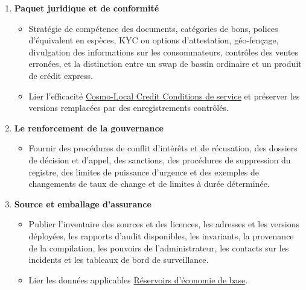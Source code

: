 \documentclass[11pt]{article}
\begin{document}
\begin{enumerate}[leftmargin=*]
\begin{itemize}[leftmargin=*]
\end{itemize}
\item \textbf{Paquet juridique et de conformité}
\begin{itemize}[leftmargin=*]
\item Stratégie de compétence des documents, catégories de bons, polices d'équivalent en espèces, KYC ou options d'attestation, géo-fençage, divulgation des informations sur les consommateurs, contrôles des ventes erronées, et la distinction entre un swap de bassin ordinaire et un produit de crédit express.
\item Lier l'efficacité \href{https://docs.cosmolocal.credit/fr/governance/terms}{Cosmo-Local Credit Conditions de service} et préserver les versions remplacées par des enregistrements contrôlés.
\end{itemize}
\item \textbf{Le renforcement de la gouvernance}
\begin{itemize}[leftmargin=*]
\item Fournir des procédures de conflit d'intérêts et de récusation, des dossiers de décision et d'appel, des sanctions, des procédures de suppression du registre, des limites de puissance d'urgence et des exemples de changements de taux de change et de limites à durée déterminée.
\end{itemize}
\item \textbf{Source et emballage d'assurance}
\begin{itemize}[leftmargin=*]
\item Publier l'inventaire des sources et des licences, les adresses et les versions déployées, les rapports d'audit disponibles, les invariants, la provenance de la compilation, les pouvoirs de l'administrateur, les contacts sur les incidents et les tableaux de bord de surveillance.
\item Lier les données applicables \href{https://github.com/grassrootseconomics}{Réservoirs d'économie de base}.
\end{itemize}
\end{enumerate}
\end{document}
